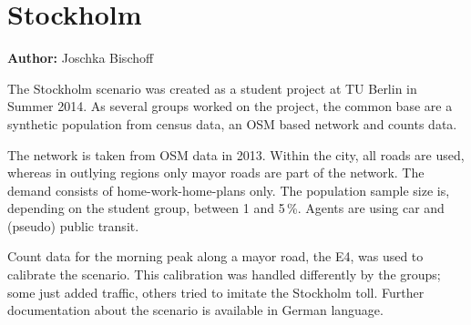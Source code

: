 \section{Stockholm}
\label{sec:stockholm}
\hfill \textbf{Author:} Joschka Bischoff

The Stockholm scenario was created as a student project at TU Berlin in Summer 2014. As several groups worked on the project, the common base are a synthetic population from census data, an OSM based network and counts data.

The network is taken from OSM data in 2013. Within the city, all roads are used, whereas in outlying regions only mayor roads are part of the network. The demand consists of home-work-home-plans only. The population sample size is, depending on the student group, between 1 and 5\,\%. Agents are using car and (pseudo) public transit.

Count data for the morning peak along a mayor road, the E4, was used to calibrate the scenario. This calibration was handled differently by the groups; some just added traffic, others tried to imitate the Stockholm toll. Further documentation about the scenario is available in German language. 

